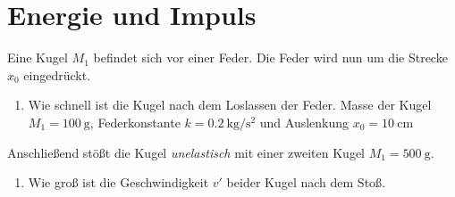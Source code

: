 \section{Energie und Impuls}
Eine Kugel $M_1$ befindet sich vor einer Feder.
Die Feder wird nun um die Strecke $x_0$ eingedrückt.
\begin{enumerate}
\item{ Wie schnell ist die Kugel nach dem Loslassen der Feder. Masse der Kugel $M_1=\SI{100}{\gram}$,
Federkonstante $k=\SI{0.2}{\kilo\gram\per\square\second}$ und Auslenkung $x_0=\SI{10}{\centi\meter}$}
\end{enumerate}
Anschließend stößt die Kugel \emph{unelastisch} mit einer zweiten Kugel $M_1=\SI{500}{\gram}$. %
\begin{enumerate}
\item {Wie groß ist die Geschwindigkeit $v'$ beider Kugel nach dem Stoß.}
\end{enumerate}
